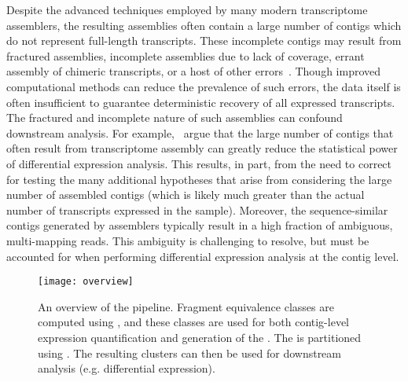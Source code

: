 Despite the advanced techniques employed by many modern \denovo transcriptome assemblers, the resulting assemblies often contain a large number of contigs which do not represent full-length transcripts.  These incomplete contigs may result from fractured assemblies, incomplete assemblies due to lack of coverage, errant assembly of chimeric transcripts, or a host of other errors~\cite{transrate}.  Though improved computational methods can reduce the prevalence of such errors, the data itself is often insufficient to guarantee deterministic recovery of all expressed transcripts.  The fractured and incomplete nature of such \denovo assemblies can confound downstream analysis.  For example,~\citet{corset} argue that the large number of contigs that often result from \denovo transcriptome assembly can greatly reduce the statistical power of differential expression analysis.  This results, in part, from the need to correct for testing the many additional hypotheses that arise from considering the large number of assembled contigs (which is likely much greater than the actual number of transcripts expressed in the sample).  Moreover, the sequence-similar contigs generated by \denovo assemblers typically result in a high fraction of ambiguous, multi-mapping reads.  This ambiguity is challenging to resolve, but must be accounted for when performing differential expression analysis at the contig level.

\begin{figure}[!ht]
\texttt{[image: overview]}
\centering
\caption{\label{fig:overview}An overview of the \rapclust pipeline. Fragment equivalence classes are computed using \qm, and these classes are used for both contig-level expression quantification and generation of the \ambiggraph. The \ambiggraph is partitioned using \mcl.  The resulting clusters can then be used for downstream analysis (e.g. differential expression).}
\end{figure}

